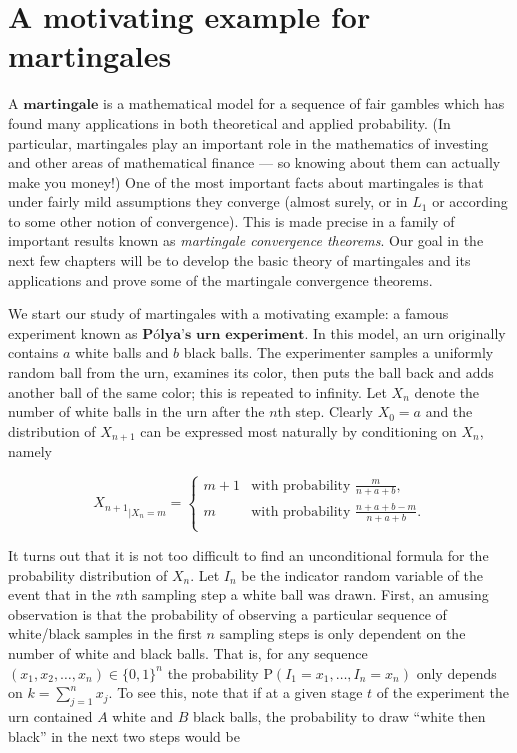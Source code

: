 

\chapter{A motivating example for martingales}
A $\textbf{martingale}$ is a mathematical model for a
sequence of fair gambles which has found many
applications in both theoretical and applied
probability. (In particular, martingales play an
important role in the mathematics of investing and
other areas of mathematical finance --- so knowing
about them can actually make you money!) One of the
most important facts about martingales is that under
fairly mild assumptions they converge (almost surely,
or in $L_1$ or according to some other notion of
convergence). This is made precise in a family of
important results known as \emph{martingale convergence
theorems}. Our goal in the next few chapters will be
to develop the basic theory of martingales and its
applications and prove some of the martingale
convergence theorems.

We start our study of martingales with a motivating
example: a famous experiment known as
$\textbf{Pólya's urn experiment}$. In this model, an
urn originally contains $a$ white balls and $b$ black
balls. The experimenter samples a uniformly random
ball from the urn, examines its color, then puts the
ball back and adds another ball of the same color;
this is repeated to infinity. Let $X_n$ denote the
number of white balls in the urn after the $n$th
step. Clearly $X_0 = a$ and the distribution of
$X_{n+1}$ can be expressed most naturally by
conditioning on $X_n$, namely

\begin{equation*} \tag{1}\label{eq:polya-conditional}
{X_{n+1}}_{\big| X_n = m} =
\begin{cases}
m+1 & \textrm{with probability }\frac{m}{n+a+b}, \\
m & \textrm{with probability }\frac{n+a+b-m}{n+a+b}. \\
\end{cases}
\end{equation*}

\noindent It turns out that it is not too difficult to find an
unconditional formula for the probability distribution
of $X_n$. Let $I_n$ be the indicator random variable
of the event that in the $n$th sampling step a white
ball was drawn. First, an amusing observation is that
the probability of observing a particular sequence of
white/black samples in the first $n$ sampling steps
is only dependent on the number of white and black
balls. That is, for any sequence
$(x_1,x_2,\ldots,x_n)\in \{0,1\}^n$ the probability
$\mathrm{P}(I_1 = x_1, \ldots, I_n = x_n)$ only
depends on $k=\sum_{j=1}^n x_j$. To see this, note
that if at a given stage $t$ of the experiment the
urn contained $A$ white and $B$ black balls, the
probability to draw ``white then black'' in the next
two steps would be

